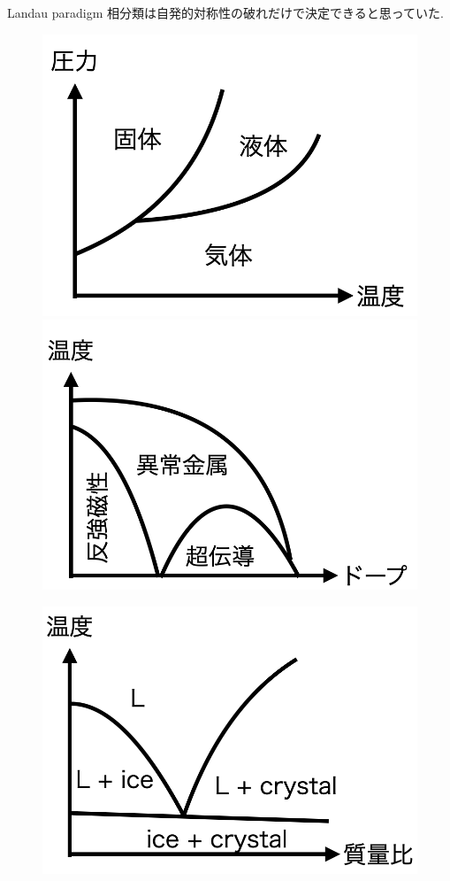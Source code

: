 \documentclass[dvipdfm]{beamer}
\begin{document}
\begin{frame}{Landau paradigm}
    相分類は自発的対称性の破れだけで決定できると思っていた.
    \begin{figure}
        \centering
        \begin{minipage}{0.45\linewidth}
            \centering
            \includegraphics[width=0.8\linewidth]{phase3.png}
        \end{minipage}
        \begin{minipage}{0.45\linewidth}
            \centering
            \includegraphics[width=0.8\linewidth]{phase-mag.png}
        \end{minipage}
    \end{figure}
    \begin{figure}
        \centering
        \begin{minipage}{0.45\linewidth}
            \centering
            \includegraphics[width=0.8\linewidth]{melt.png}

\end{minipage}
\end{figure}
\end{frame}
\end{document}
